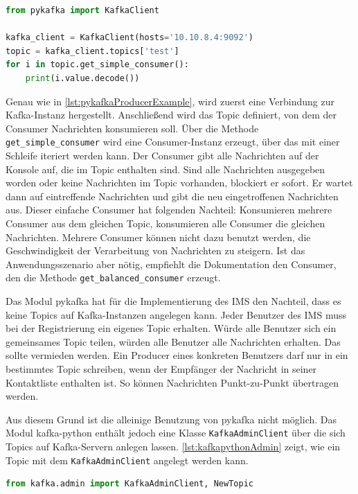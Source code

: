 \documentclass[a4paper,titlepage,halfparskip,12pt]{scrreprt}
\begin{document}
\begin{onehalfspacing}
\begin{lstlisting}[language=python, caption={Beispiel: Verwendung des Consumers des Moduls pykafka}, label={lst:pykafkaConsumerExample}]
from pykafka import KafkaClient

kafka_client = KafkaClient(hosts='10.10.8.4:9092')
topic = kafka_client.topics['test']
for i in topic.get_simple_consumer():
    print(i.value.decode())
\end{lstlisting}

Genau wie in \autoref{lst:pykafkaProducerExample}, wird zuerst eine Verbindung zur Kafka-Instanz hergestellt. Anschließend wird das Topic definiert, von dem der Consumer Nachrichten konsumieren soll. Über die Methode \texttt{get\_simple\_consumer} wird eine Consumer-Instanz erzeugt, über das mit einer Schleife iteriert werden kann. Der Consumer gibt alle Nachrichten auf der Konsole auf, die im Topic enthalten sind. Sind alle Nachrichten ausgegeben worden oder keine Nachrichten im Topic vorhanden, blockiert er sofort. Er wartet dann auf eintreffende Nachrichten und gibt die neu eingetroffenen Nachrichten aus. Dieser einfache Consumer hat folgenden Nachteil: Konsumieren mehrere Consumer aus dem gleichen Topic, konsumieren alle Consumer die gleichen Nachrichten. Mehrere Consumer können nicht dazu benutzt werden, die Geschwindigkeit der Verarbeitung von Nachrichten zu steigern. Ist das Anwendungsszenario aber nötig, empfiehlt die Dokumentation den Consumer, den die Methode \texttt{get\_balanced\_consumer} erzeugt.

Das Modul pykafka hat für die Implementierung des \acs{IMS} den Nachteil, dass es keine Topics auf Kafka-Instanzen angelegen kann. Jeder Benutzer des \acs{IMS} muss bei der Registrierung ein eigenes Topic erhalten. Würde alle Benutzer sich ein gemeinsames Topic teilen, würden alle Benutzer alle Nachrichten erhalten. Das sollte vermieden werden. Ein Producer eines konkreten Benutzers darf nur in ein bestimmtes Topic schreiben, wenn der Empfänger der Nachricht in seiner Kontaktliste enthalten ist. So können Nachrichten Punkt-zu-Punkt übertragen werden.

Aus diesem Grund ist die alleinige Benutzung von pykafka nicht möglich. Das Modul kafka-python enthält jedoch eine Klasse \texttt{KafkaAdminClient} über die sich Topics auf Kafka-Servern anlegen lassen. \autoref{lst:kafkapythonAdmin} zeigt, wie ein Topic mit dem \texttt{KafkaAdminClient} angelegt werden kann.

\begin{lstlisting}[language=python, caption={Beispiel: Anlegen eines Topics mit dem KafkaAdminClient des Moduls kafka-python}, label={lst:kafkapythonAdmin}]
from kafka.admin import KafkaAdminClient, NewTopic


\end{lstlisting}
\end{onehalfspacing}
\end{document}
